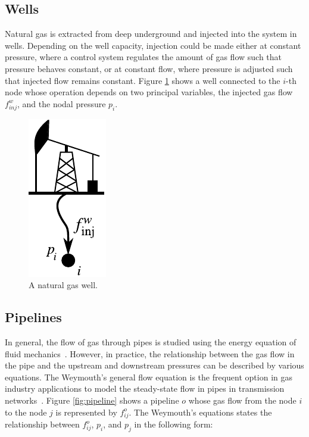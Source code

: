 \subsection{Wells}
\label{subsec:wells}

Natural gas is extracted from deep underground and injected into the system in wells. Depending on the well capacity, injection could be made either at constant pressure, where a control system regulates the amount of gas flow such that pressure behaves constant, or at constant flow, where pressure is adjusted such that injected flow remains constant. Figure \ref{fig:well} shows a well connected to the $i$-th node whose operation depends on two principal variables, the injected gas flow $f_{inj}^w$, and the nodal pressure $p_i$.

\begin{figure}[!ht]
	\centering
	\includegraphics[scale=0.9]{Figures/Well}
	\caption{A natural gas well.}	
	\label{fig:well}
\end{figure}

\subsection{Pipelines}
\label{subsec:pipelines}

In general, the flow of gas through pipes is studied using the energy equation of fluid mechanics~\cite{Banda2006}. However, in practice, the relationship between the gas flow in the pipe and the upstream and downstream pressures can be described by various equations. The Weymouth's general flow equation is the frequent option in gas industry applications to model the steady-state flow in pipes in transmission networks~\cite{Woldeyohannes2011}. Figure \ref{fig:pipeline} shows a pipeline $o$ whose gas flow from the node $i$ to the node $j$ is represented by $f_{ij}^o$. The Weymouth's equations states the relationship between $f_{ij}^o$, $p_i$, and $p_j$ in the following form:

